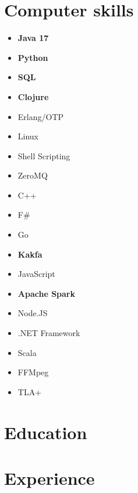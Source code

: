 \documentclass[11pt,a4paper,roman,english]{moderncv}        %
\begin{document}


\makecvtitle
\section{Computer skills}
\begin{multicols}{4}
	\begin{itemize}
		\item[] \textbf{Java 17}
		\item[] \textbf{Python}
		\item[] \textbf{SQL}
		\item[] \textbf{Clojure}
		\item[] Erlang/OTP
		\item[] Linux
		\item[] Shell Scripting
		\item[] ZeroMQ
		\item[] C++
		\item[] F\#
		\item[] Go
		\item[] \textbf{Kakfa}
		\item[] JavaScript
		\item[] \textbf{Apache Spark}
		\item[] Node.JS
		\item[] .NET Framework
		\item[] Scala
		\item[] FFMpeg
        \item[] TLA+
	\end{itemize}
\end{multicols}
\section{Education}
\section{Experience}
\end{document}
